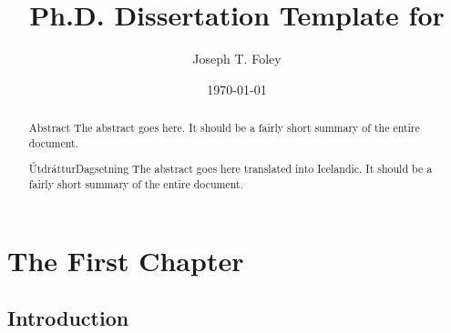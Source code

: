 \documentclass[12pt,a4paper,titlepage]{memoir}
\title{Ph.D. Dissertation Template for \theInstitution{}}
\author{Joseph T. Foley}%
\date{\today}%
\begin{document}
\maketitle
\copyrightpage{}
\signaturepage{}
\archivesigpage{}

\begin{abstract}{Abstract}{\thetitle}{\thedate}
  The abstract goes here.
  It should be a fairly short summary of the entire document.
\end{abstract}

\begin{abstract}{Útdráttur}{\thetitleIS}{Dagsetning}
  The abstract goes here translated into Icelandic.
  It should be a fairly short summary of the entire document.
\end{abstract}


\tableofcontents{}%

\mainmatter{}
\chapter{The First Chapter}
\section{Introduction}
\lipsum[0-20]
\end{document}
